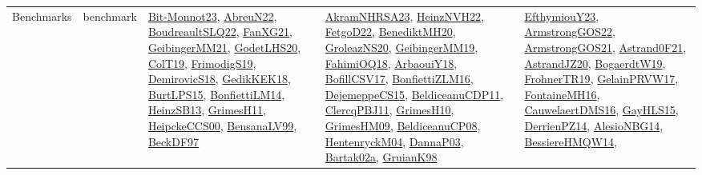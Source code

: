 {\begin{longtable}{lp{3cm}>{\raggedright}p{6cm}>{\raggedright}p{6cm}p{8cm}}
Benchmarks & benchmark & \href{papers/Bit-Monnot23.pdf}{Bit-Monnot23}\cite{Bit-Monnot23}, \href{articles/AbreuN22.pdf}{AbreuN22}\cite{AbreuN22}, \href{papers/BoudreaultSLQ22.pdf}{BoudreaultSLQ22}\cite{BoudreaultSLQ22}, \href{articles/FanXG21.pdf}{FanXG21}\cite{FanXG21}, \href{papers/GeibingerMM21.pdf}{GeibingerMM21}\cite{GeibingerMM21}, \href{papers/GodetLHS20.pdf}{GodetLHS20}\cite{GodetLHS20}, \href{papers/ColT19.pdf}{ColT19}\cite{ColT19}, \href{papers/FrimodigS19.pdf}{FrimodigS19}\cite{FrimodigS19}, \href{papers/DemirovicS18.pdf}{DemirovicS18}\cite{DemirovicS18}, \href{articles/GedikKEK18.pdf}{GedikKEK18}\cite{GedikKEK18}, \href{papers/BurtLPS15.pdf}{BurtLPS15}\cite{BurtLPS15}, \href{papers/BonfiettiLM14.pdf}{BonfiettiLM14}\cite{BonfiettiLM14}, \href{articles/HeinzSB13.pdf}{HeinzSB13}\cite{HeinzSB13}, \href{papers/GrimesH11.pdf}{GrimesH11}\cite{GrimesH11}, \href{articles/HeipckeCCS00.pdf}{HeipckeCCS00}\cite{HeipckeCCS00}, \href{articles/BensanaLV99.pdf}{BensanaLV99}\cite{BensanaLV99}, \href{papers/BeckDF97.pdf}{BeckDF97}\cite{BeckDF97} & \href{articles/AkramNHRSA23.pdf}{AkramNHRSA23}\cite{AkramNHRSA23}, \href{articles/HeinzNVH22.pdf}{HeinzNVH22}\cite{HeinzNVH22}, \href{articles/FetgoD22.pdf}{FetgoD22}\cite{FetgoD22}, \href{articles/BenediktMH20.pdf}{BenediktMH20}\cite{BenediktMH20}, \href{papers/GroleazNS20.pdf}{GroleazNS20}\cite{GroleazNS20}, \href{papers/GeibingerMM19.pdf}{GeibingerMM19}\cite{GeibingerMM19}, \href{articles/FahimiOQ18.pdf}{FahimiOQ18}\cite{FahimiOQ18}, \href{papers/ArbaouiY18.pdf}{ArbaouiY18}\cite{ArbaouiY18}, \href{papers/BofillCSV17.pdf}{BofillCSV17}\cite{BofillCSV17}, \href{papers/BonfiettiZLM16.pdf}{BonfiettiZLM16}\cite{BonfiettiZLM16}, \href{papers/DejemeppeCS15.pdf}{DejemeppeCS15}\cite{DejemeppeCS15}, \href{articles/BeldiceanuCDP11.pdf}{BeldiceanuCDP11}\cite{BeldiceanuCDP11}, \href{papers/ClercqPBJ11.pdf}{ClercqPBJ11}\cite{ClercqPBJ11}, \href{papers/GrimesH10.pdf}{GrimesH10}\cite{GrimesH10}, \href{papers/GrimesHM09.pdf}{GrimesHM09}\cite{GrimesHM09}, \href{papers/BeldiceanuCP08.pdf}{BeldiceanuCP08}\cite{BeldiceanuCP08}, \href{papers/HentenryckM04.pdf}{HentenryckM04}\cite{HentenryckM04}, \href{papers/DannaP03.pdf}{DannaP03}\cite{DannaP03}, \href{papers/Bartak02a.pdf}{Bartak02a}\cite{Bartak02a}, \href{papers/GruianK98.pdf}{GruianK98}\cite{GruianK98} & \href{papers/EfthymiouY23.pdf}{EfthymiouY23}\cite{EfthymiouY23}, \href{papers/ArmstrongGOS22.pdf}{ArmstrongGOS22}\cite{ArmstrongGOS22}, \href{papers/ArmstrongGOS21.pdf}{ArmstrongGOS21}\cite{ArmstrongGOS21}, \href{papers/Astrand0F21.pdf}{Astrand0F21}\cite{Astrand0F21}, \href{articles/AstrandJZ20.pdf}{AstrandJZ20}\cite{AstrandJZ20}, \href{papers/BogaerdtW19.pdf}{BogaerdtW19}\cite{BogaerdtW19}, \href{papers/FrohnerTR19.pdf}{FrohnerTR19}\cite{FrohnerTR19}, \href{papers/GelainPRVW17.pdf}{GelainPRVW17}\cite{GelainPRVW17}, \href{papers/FontaineMH16.pdf}{FontaineMH16}\cite{FontaineMH16}, \href{papers/CauwelaertDMS16.pdf}{CauwelaertDMS16}\cite{CauwelaertDMS16}, \href{papers/GayHLS15.pdf}{GayHLS15}\cite{GayHLS15}, \href{papers/DerrienPZ14.pdf}{DerrienPZ14}\cite{DerrienPZ14}, \href{papers/AlesioNBG14.pdf}{AlesioNBG14}\cite{AlesioNBG14}, \href{papers/BessiereHMQW14.pdf}{BessiereHMQW14}\cite{BessiereHMQW14}, 
\end{longtable}}
